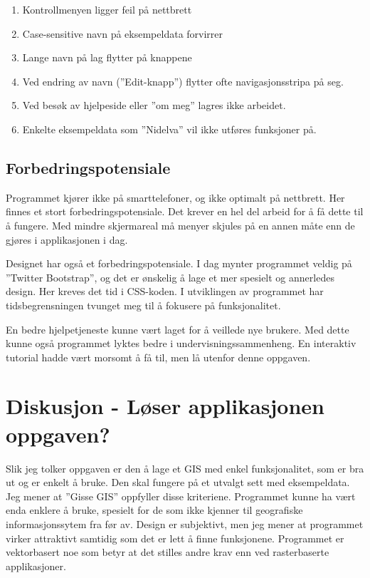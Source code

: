 \documentclass[12pt,twoside,onecolumn]{article}
\begin{document}
	\begin{enumerate}
		\item Kontrollmenyen ligger feil på nettbrett
		\item Case-sensitive navn på eksempeldata forvirrer
		\item Lange navn på lag flytter på knappene
		\item Ved endring av navn (''Edit-knapp'') flytter ofte navigasjonsstripa på seg.
		\item Ved besøk av hjelpeside eller ''om meg'' lagres ikke arbeidet.
		\item Enkelte eksempeldata som ''Nidelva'' vil ikke utføres funksjoner på.
		
	\end{enumerate}
	
	
	\subsection{Forbedringspotensiale}
	
	Programmet kjører ikke på smarttelefoner, og ikke optimalt på nettbrett. Her finnes et stort forbedringspotensiale. Det krever en hel del arbeid for å få dette til å fungere. Med mindre skjermareal må menyer skjules på en annen måte enn de gjøres i applikasjonen i dag.
	
	Designet har også et forbedringspotensiale. I dag mynter programmet veldig på ''Twitter Bootstrap'', og det er ønskelig å lage et mer spesielt og annerledes design. Her kreves det tid i CSS-koden. I utviklingen av programmet har tidsbegrensningen tvunget meg til å fokusere på funksjonalitet.
	
	En bedre hjelpetjeneste kunne vært laget for å veillede nye brukere. Med dette kunne også programmet lyktes bedre i undervisningssammenheng. En interaktiv tutorial hadde vært morsomt å få til, men lå utenfor denne oppgaven. 
	
\section{Diskusjon - Løser applikasjonen oppgaven?}
	Slik jeg tolker oppgaven er den å lage et GIS med enkel funksjonalitet, som er bra ut og er enkelt å bruke. Den skal fungere på et utvalgt sett med eksempeldata. Jeg mener at ''Gisse GIS'' oppfyller disse kriteriene. Programmet kunne ha vært enda enklere å bruke, spesielt for de som ikke kjenner til geografiske informasjonssytem fra før av. Design er subjektivt, men jeg mener at programmet virker attraktivt samtidig som det er lett å finne funksjonene. Programmet er vektorbasert noe som betyr at det stilles andre krav enn ved rasterbaserte applikasjoner.
	
\end{document}
